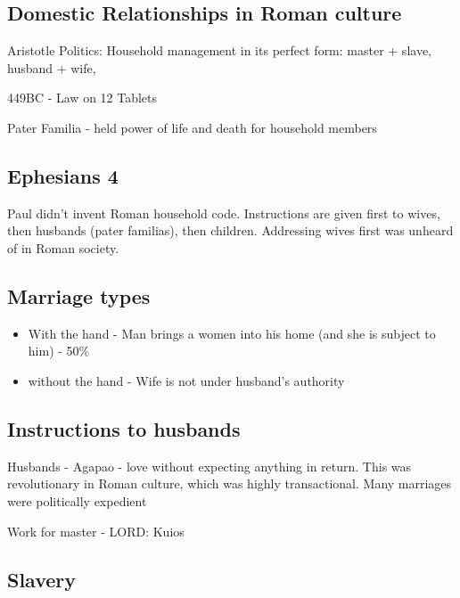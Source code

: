 \documentclass[
]{book}
\providecommand{\tightlist}{%
  \setlength{\itemsep}{0pt}\setlength{\parskip}{0pt}}
\begin{document}
\hypertarget{domestic-relationships-in-roman-culture}{%
\subsection{Domestic Relationships in Roman culture}\label{domestic-relationships-in-roman-culture}}

Aristotle Politics: Household management in its perfect form: master + slave, husband + wife,

449BC - Law on 12 Tablets

Pater Familia - held power of life and death for household members

\hypertarget{ephesians-4}{%
\subsection{Ephesians 4}\label{ephesians-4}}

Paul didn't invent Roman household code. Instructions are given first to wives, then husbands (pater familias), then children. Addressing wives first was unheard of in Roman society.

\hypertarget{marriage-types}{%
\subsection{Marriage types}\label{marriage-types}}

\begin{itemize}
\tightlist
\item
  With the hand - Man brings a women into his home (and she is subject to him) - 50\%
\item
  without the hand - Wife is not under husband's authority
\end{itemize}

\hypertarget{instructions-to-husbands}{%
\subsection{Instructions to husbands}\label{instructions-to-husbands}}

Husbands - Agapao - love without expecting anything in return. This was revolutionary in Roman culture, which was highly transactional. Many marriages were politically expedient

Work for master - LORD: Kuios

\hypertarget{slavery}{%
\subsection{Slavery}\label{slavery}}
\end{document}
